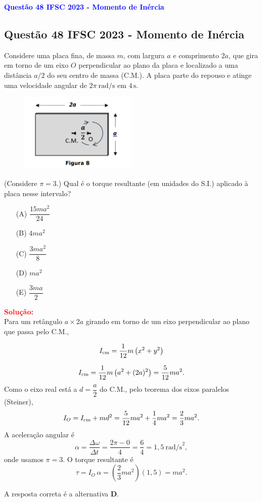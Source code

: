 \begin{flushleft}
\textbf{\textcolor{blue}{\Large Quest\~ao 48 IFSC 2023 - Momento de In\'ercia}}\\
\noindent

\subsection{Quest\~ao 48 IFSC 2023 - Momento de In\'ercia}

Considere uma placa fina, de massa $m$, com largura $a$ e comprimento $2a$, que gira em torno de um eixo $O$ perpendicular ao plano da 
placa e localizado a uma distância $a/2$ do seu centro de massa (C.M.). A placa parte do repouso e atinge uma velocidade angular de 
$2\pi\ \text{rad/s}$ em $4\,\text{s}$. 

\begin{figure}[!h]
\centering
\includegraphics[width=0.5\textwidth]{figures/torque_momento_inercia.png}
\end{figure}

(Considere $\pi=3$.) Qual é o torque resultante (em unidades do S.I.) aplicado à placa nesse intervalo?

\begin{itemize}
\item[(A)] $\dfrac{15ma^2}{24}$
\item[(B)] $4ma^2$
\item[(C)] $\dfrac{3ma^2}{8}$
\item[(D)] $ma^2$
\item[(E)] $\dfrac{3ma}{2}$
\end{itemize}

\vspace{0.5cm}

\textcolor{red}{\textbf{Solução:}}\\

Para um retângulo $a \times 2a$ girando em torno de um eixo perpendicular ao plano que passa pelo C.M.,

\[
I_{\rm cm}=\frac{1}{12}m\left(x^2+y^2\right)
\]

\[
I_{\rm cm}=\frac{1}{12}m\left(a^2+(2a)^2\right)=\frac{5}{12}ma^2.
\]
Como o eixo real está a $d=\dfrac{a}{2}$ do C.M., pelo teorema dos eixos paralelos (Steiner),
\[
I_O=I_{\rm cm}+md^2=\frac{5}{12}ma^2+\frac{1}{4}ma^2
=\frac{2}{3}ma^2.
\]
A aceleração angular é
\[
\alpha=\frac{\Delta\omega}{\Delta t}=\frac{2\pi-0}{4}
=\frac{6}{4}=1{,}5\ \text{rad/s}^2,
\]
onde usamos $\pi=3$. O torque resultante é
\[
\tau = I_O\,\alpha = \left(\frac{2}{3}ma^2\right)\left(1{,}5\right)=ma^2.
\]

\medskip
A resposta correta é a alternativa \colorbox{green!50}{\textbf{D}}.

\end{flushleft}

